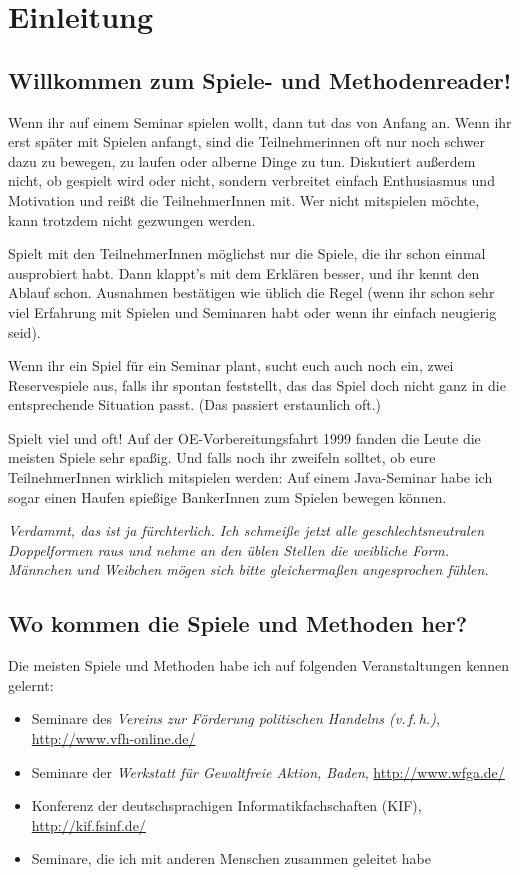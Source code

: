 \chapter{Einleitung}
\section{Willkommen zum Spiele- und Methodenreader!}

Wenn ihr auf einem Seminar spielen wollt, dann tut das von Anfang an. Wenn ihr erst später mit Spielen anfangt, sind die Teilnehmerinnen oft nur noch schwer dazu zu bewegen, zu laufen oder alberne Dinge zu tun. Diskutiert außerdem nicht, ob gespielt wird oder nicht, sondern verbreitet einfach Enthusiasmus und Motivation und reißt die TeilnehmerInnen mit. Wer nicht mitspielen möchte, kann trotzdem nicht gezwungen werden.

Spielt mit den TeilnehmerInnen möglichst nur die Spiele, die ihr schon einmal ausprobiert habt. Dann klappt's mit dem Erklären besser, und ihr kennt den Ablauf schon. Ausnahmen bestätigen wie üblich die Regel (wenn ihr schon sehr viel Erfahrung mit Spielen und Seminaren habt oder wenn ihr einfach neugierig seid).

Wenn ihr ein Spiel für ein Seminar plant, sucht euch auch noch ein, zwei Reservespiele aus, falls ihr spontan feststellt, das das Spiel doch nicht ganz in die entsprechende Situation passt. (Das passiert erstaunlich oft.)

Spielt viel und oft! Auf der OE-Vorbereitungsfahrt 1999 fanden die Leute die meisten Spiele sehr spaßig. Und falls noch ihr zweifeln solltet, ob eure TeilnehmerInnen wirklich mitspielen werden: Auf einem Java-Seminar habe ich sogar einen Haufen spießige BankerInnen zum Spielen bewegen können.

\emph{Verdammt, das ist ja fürchterlich. Ich schmeiße jetzt alle geschlechtsneutralen Doppelformen raus und nehme an den üblen Stellen die weibliche Form. Männchen und Weibchen mögen sich bitte gleichermaßen angesprochen fühlen.}

\section{Wo kommen die Spiele und Methoden her?}
Die meisten Spiele und Methoden habe ich auf folgenden Veranstaltungen kennen gelernt:
\begin{itemize}
  \item Seminare des \emph{Vereins zur Förderung politischen Handelns (v.\,f.\,h.)}, \url{http://www.vfh-online.de/}
  \item Seminare der \emph{Werkstatt für Gewaltfreie Aktion, Baden}, \url{http://www.wfga.de/}
  \item Konferenz der deutschsprachigen Informatikfachschaften (KIF), \url{http://kif.fsinf.de/}
  \item Seminare, die ich mit anderen Menschen zusammen geleitet habe
\end{itemize}

